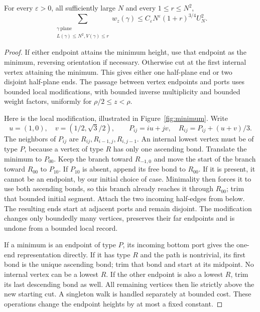 \begin{lemma}\label{lem:twoends}\label{R:thermal:smallheight}
For every $\varepsilon>0$, all sufficiently large $N$ and every $1\le r\le N^2$,
\[
 \sum_{\substack{\gamma\ \mathrm{plane}\\L(\gamma)\le N^2, V(\gamma)\le r}}
       w_z(\gamma)
 \le C_\varepsilon N^\varepsilon(1+r)^{3/4}U_N^2.
\]
\end{lemma}
\begin{proof}
If either endpoint attains the minimum height, use that endpoint as the minimum, reversing orientation if necessary. Otherwise cut at the first internal vertex attaining the minimum. This gives either one half-plane end or two disjoint half-plane ends. The passage between vertex endpoints and ports uses bounded local modifications, with bounded inverse multiplicity and bounded weight factors, uniformly for $\rho/2\le z<\rho$.

Here is the local modification, illustrated in Figure~\ref{fig:minimum}. Write
\[
 u=(1,0),\quad v=(1/2,\sqrt3/2),\qquad
 P_{ij}=iu+jv,\quad R_{ij}=P_{ij}+(u+v)/3.
\]
The neighbors of $P_{ij}$ are $R_{ij},R_{i-1,j},R_{i,j-1}$. An internal lowest vertex must be of type $P$, because a vertex of type $R$ has only one ascending bond. Translate the minimum to $P_{00}$. Keep the branch toward $R_{-1,0}$ and move the start of the branch toward $R_{00}$ to $P_{10}$. If $P_{10}$ is absent, append its free bond to $R_{00}$. If it is present, it cannot be an endpoint, by our initial choice of case. Minimality then forces it to use both ascending bonds, so this branch already reaches it through $R_{00}$; trim that bounded initial segment. Attach the two incoming half-edges from below. The resulting ends start at adjacent ports and remain disjoint. The modification changes only boundedly many vertices, preserves their far endpoints and is undone from a bounded local record.

If a minimum is an endpoint of type $P$, its incoming bottom port gives the one-end representation directly. If it has type $R$ and the path is nontrivial, its first bond is the unique ascending bond; trim that bond and start at its midpoint. No internal vertex can be a lowest $R$. If the other endpoint is also a lowest $R$, trim its last descending bond as well. All remaining vertices then lie strictly above the new starting cut. A singleton walk is handled separately at bounded cost. These operations change the endpoint heights by at most a fixed constant.


\end{proof}
